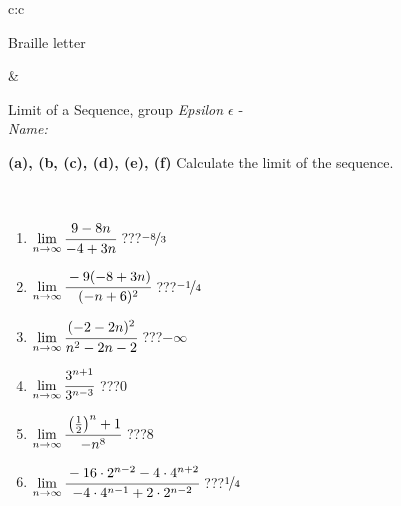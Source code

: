 \documentclass[10pt]{report}
\begin{document}
\begin{tabular}{c:c}
\begin{minipage}[c][104.5mm][t]{0.5\linewidth}
\begin{center}
\begin{minipage}{0.20\linewidth}
\begin{center}
{\small Braille letter}
\end{center}
\end{minipage}
\end{center}
\end{minipage}
&
\begin{minipage}[c][104.5mm][t]{0.5\linewidth}
\begin{center}
\vspace{5mm}
{\huge Limit of a Sequence, group \textit{Epsilon $\epsilon$} -}\\[5mm]
\textit{Name:}\phantom{xxxxxxxxxxxxxxxxxxxxxxxxxxxxxxxxxxxxxxxxxxxxxxxxxxxxxxxxxxxxxxxxx}\\[5mm]
\begin{minipage}{0.95\linewidth}
\begin{center}
{
\textbf{(a), (b, (c), (d), (e), (f)} Calculate the limit of the sequence. \\[-1mm]
\phantom{x}
}
\end{center}
\end{minipage}
\\[1mm]
\begin{minipage}{0.79\linewidth}
\begin{center}
\begin{varwidth}{\linewidth}
\setlength{\itemsep}{0pt}
\begin{enumerate}
\normalsize
\item $\lim\limits_{n\to\infty}\cfrac{9-8n}{-4+3n}$\quad \dotfill\; ???\;\dotfill \quad $\nicefrac{-8}{3}$
\item $\lim\limits_{n\to\infty}\cfrac{-9(-8+3n)}{(-n+6)^2}$\quad \dotfill\; ???\;\dotfill \quad $\nicefrac{-1}{4}$
\item $\lim\limits_{n\to\infty}\cfrac{(-2-2n)^2}{n^2-2n-2}$\quad \dotfill\; ???\;\dotfill \quad $-\infty$
\item $\lim\limits_{n\to\infty}\cfrac{3^{n+1}}{3^{n-3}}$\quad \dotfill\; ???\;\dotfill \quad $0$
\item $\lim\limits_{n\to\infty}\cfrac{\left(\frac{1}{2}\right)^n +1}{-n^{8}}$\quad \dotfill\; ???\;\dotfill \quad $8$
\item $\lim\limits_{n\to\infty}\cfrac{-16\cdot 2^{n-2}-4\cdot 4^{n+2}}{-4\cdot 4^{n-1}+2\cdot 2^{n-2}}$\quad \dotfill\; ???\;\dotfill \quad $\nicefrac{1}{4}$
\end{enumerate}
\end{varwidth}
\end{center}
\end{minipage}
\begin{minipage}{0.20\linewidth}

\end{minipage}
\end{center}
\end{minipage}
\end{tabular}
\end{document}

